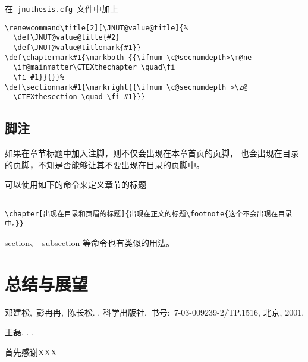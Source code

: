 \documentclass[pdftex, twoside, bachelor]{JNUthesis}
\begin{document}
\begin{spacing}{1.25}
\begin{ANS}
在~\texttt{jnuthesis.cfg}~文件中加上
\begin{verbatim}
\renewcommand\title[2][\JNUT@value@title]{%
  \def\JNUT@value@title{#2}
  \def\JNUT@value@titlemark{#1}}
\def\chaptermark#1{\markboth {{\ifnum \c@secnumdepth>\m@ne
  \if@mainmatter\CTEXthechapter \quad\fi
  \fi #1}}{}}%
\def\sectionmark#1{\markright{{\ifnum \c@secnumdepth >\z@
  \CTEXthesection \quad \fi #1}}}
\end{verbatim}
\end{ANS}


\section{脚注}

\begin{FAQ}
如果在章节标题中加入注脚，则不仅会出现在本章首页的页脚，
也会出现在目录的页脚，不知是否能够让其不要出现在目录的页脚中。
\end{FAQ}

\begin{ANS}
可以使用如下的命令来定义章节的标题

\begin{verbatim}

\chapter[出现在目录和页眉的标题]{出现在正文的标题\footnote{这个不会出现在目录中。}}

\end{verbatim}
section、~subsection 等命令也有类似的用法。
\end{ANS}

\chapter{总结与展望}
\label{C:CONC}



%

\begin{thebibliography}{2}

{邓建松,~彭冉冉,~陈长松}.
.
\newblock 科学出版社,~书号:~7-03-009239-2/TP.1516, 北京, 2001.

王磊.
.
.
\end{thebibliography}

\begin{thanks}

首先感谢XXX

\end{thanks}
\clearpage

\maketitle[related]

\end{spacing}
\end{document}
